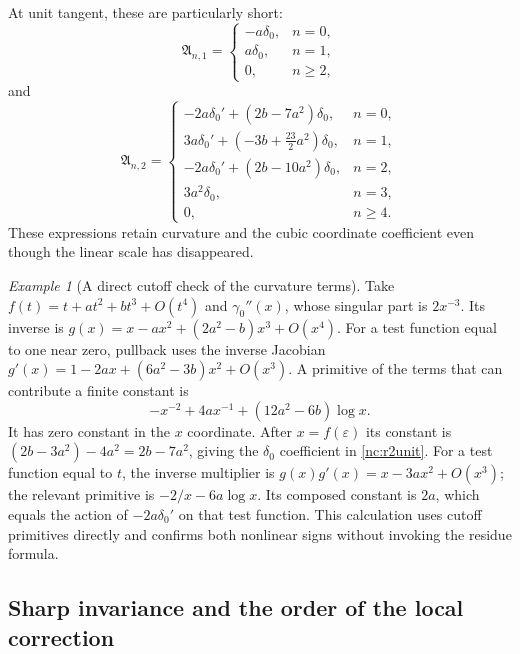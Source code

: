 \documentclass[11pt,a4paper]{article}
\numberwithin{equation}{section}
\theoremstyle{definition}
\theoremstyle{remark}
\newtheorem{example}[theorem]{Example}
\newcommand{\eps}{\varepsilon}
\begin{document}
At unit tangent, these are particularly short:
\begin{equation}\label{nc:r1unit}
 \mathfrak A_{n,1}=
 \begin{cases}
  -a\delta_0,&n=0,\\
  a\delta_0,&n=1,\\
  0,&n\geq2,
 \end{cases}
\end{equation}
and
\begin{equation}\label{nc:r2unit}
 \mathfrak A_{n,2}=
 \begin{cases}
  -2a\delta_0'+(2b-7a^2)\delta_0,&n=0,\\
  3a\delta_0'+(-3b+\tfrac{23}{2}a^2)\delta_0,&n=1,\\
  -2a\delta_0'+(2b-10a^2)\delta_0,&n=2,\\
  3a^2\delta_0,&n=3,\\
  0,&n\geq4.
 \end{cases}
\end{equation}
These expressions retain curvature and the cubic coordinate coefficient
even though the linear scale has disappeared.

\begin{example}[A direct cutoff check of the curvature terms]
\label{nc:direct-cutoff}
Take $f(t)=t+a t^2+b t^3+O(t^4)$ and $\gamma_0''(x)$, whose singular
part is $2x^{-3}$. Its inverse is
$g(x)=x-a x^2+(2a^2-b)x^3+O(x^4)$. For a test function equal to one
near zero, pullback uses the inverse Jacobian
$g'(x)=1-2a x+(6a^2-3b)x^2+O(x^3)$.
A primitive of the terms that can contribute a finite constant is
\[
 -x^{-2}+4a x^{-1}+(12a^2-6b)\log x.
\]
It has zero constant in the $x$ coordinate. After $x=f(\eps)$ its
constant is $(2b-3a^2)-4a^2=2b-7a^2$, giving the $\delta_0$
coefficient in \eqref{nc:r2unit}. For a test function equal to $t$,
the inverse multiplier is $g(x)g'(x)=x-3a x^2+O(x^3)$; the relevant
primitive is $-2/x-6a\log x$. Its composed constant is $2a$, which
equals the action of $-2a\delta_0'$ on that test function.
This calculation uses cutoff primitives directly and confirms both
nonlinear signs without invoking the residue formula.
\end{example}

\subsection{Sharp invariance and the order of the local correction}
\end{document}
